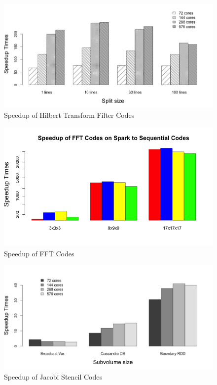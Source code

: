 \begin{figure}[h]
\includegraphics[scale=.50]{figures/HtfSpeedup.png}
\caption{Speedup of Hilbert Transform Filter Codes}
\label{HtfSpeedup}
\end{figure}


\begin{figure}[h]
\includegraphics[scale=.50]{figures/FFTSpeedup.png}
\caption{Speedup of FFT Codes}
\label{FFTSpeedup}
\end{figure}



\begin{figure}[h]
\includegraphics[scale=.50]{figures/JacobiSpeedup.png}
\caption{Speedup of Jacobi Stencil Codes}
\label{JacobiSpeedup}
\end{figure}

